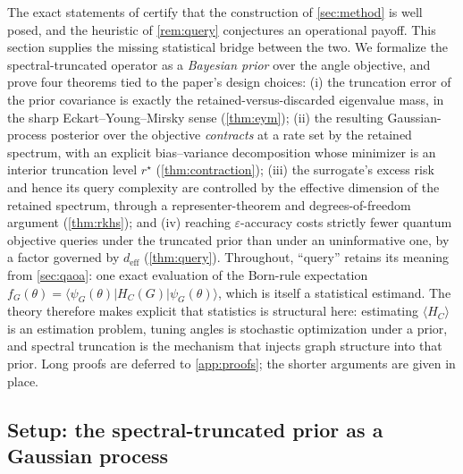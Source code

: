 \documentclass[aps,prxquantum,reprint,amsmath,amssymb,floatfix,nofootinbib,superscriptaddress,longbibliography]{revtex4-2}
\theoremstyle{remark}
\begin{document}
The exact statements of  certify that the
construction of \cref{sec:method} is well posed, and the heuristic of
\cref{rem:query} conjectures an operational payoff.  This section supplies the
missing statistical bridge between the two.  We formalize the spectral-truncated
operator as a \emph{Bayesian prior} over the angle objective, and prove four
theorems tied to the paper's design choices: (i) the truncation error of the
prior covariance is exactly the retained-versus-discarded eigenvalue mass, in the
sharp Eckart--Young--Mirsky sense (\cref{thm:eym}); (ii) the resulting
Gaussian-process posterior over the objective \emph{contracts} at a rate set by
the retained spectrum, with an explicit bias--variance decomposition whose
minimizer is an interior truncation level \(r^{\star}\) (\cref{thm:contraction});
(iii) the surrogate's excess risk and hence its query complexity are controlled
by the effective dimension of the retained spectrum, through a
representer-theorem and degrees-of-freedom argument (\cref{thm:rkhs}); and
(iv) reaching \(\varepsilon\)-accuracy costs strictly fewer quantum objective
queries under the truncated prior than under an uninformative one, by a factor
governed by \(d_{\mathrm{eff}}\) (\cref{thm:query}).  Throughout, ``query''
retains its meaning from \cref{sec:qaoa}: one exact evaluation of the Born-rule
expectation \(f_G(\theta)=\langle\psi_G(\theta)|H_C(G)|\psi_G(\theta)\rangle\),
which is itself a statistical estimand.  The theory therefore makes explicit that
statistics is structural here: estimating \(\langle H_C\rangle\) is an estimation
problem, tuning angles is stochastic optimization under a prior, and spectral
truncation is the mechanism that injects graph structure into that prior.
Long proofs are deferred to \cref{app:proofs}; the shorter arguments are given
in place.

\subsection{Setup: the spectral-truncated prior as a Gaussian process}
\label{sec:gp-setup}
\end{document}
